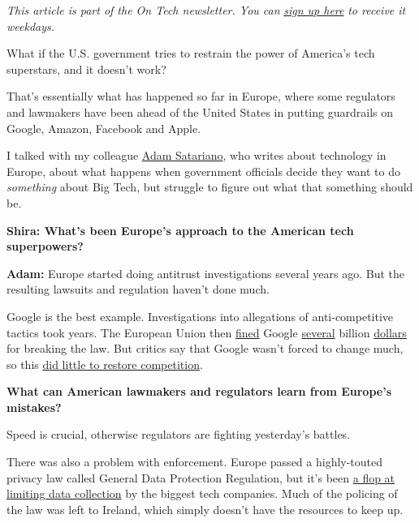 \emph{This article is part of the On Tech newsletter. You can}
\href{https://www.nytimes3xbfgragh.onion/newsletters/signup/OT}{\emph{sign
up here}} \emph{to receive it weekdays.}

What if the U.S. government tries to restrain the power of America's
tech superstars, and it doesn't work?

That's essentially what has happened so far in Europe, where some
regulators and lawmakers have been ahead of the United States in putting
guardrails on Google, Amazon, Facebook and Apple.

I talked with my colleague
\href{https://www.nytimes3xbfgragh.onion/by/adam-satariano}{Adam
Satariano}, who writes about technology in Europe, about what happens
when government officials decide they want to do \emph{something} about
Big Tech, but struggle to figure out what that something should be.

\textbf{Shira: What's been Europe's approach to the American tech
superpowers?}

\textbf{Adam:} Europe started doing antitrust investigations several
years ago. But the resulting lawsuits and regulation haven't done much.

Google is the best example. Investigations into allegations of
anti-competitive tactics took years. The European Union then
\href{https://www.nytimes3xbfgragh.onion/2018/07/18/technology/google-eu-android-fine.html}{fined}
Google
\href{https://www.nytimes3xbfgragh.onion/2017/06/27/technology/eu-google-fine.html}{several}
billion
\href{https://www.nytimes3xbfgragh.onion/2019/03/20/business/google-fine-advertising.html}{dollars}
for breaking the law. But critics say that Google wasn't forced to
change much, so this
\href{https://www.nytimes3xbfgragh.onion/2019/11/11/business/europe-technology-antitrust-regulation.html}{did
little to restore competition}.

\textbf{What can American lawmakers and regulators learn from Europe's
mistakes?}

Speed is crucial, otherwise regulators are fighting yesterday's battles.

There was also a problem with enforcement. Europe passed a highly-touted
privacy law called General Data Protection Regulation, but it's been
\href{https://www.nytimes3xbfgragh.onion/2020/04/27/technology/GDPR-privacy-law-europe.html}{a
flop at limiting data collection} by the biggest tech companies. Much of
the policing of the law was left to Ireland, which simply doesn't have
the resources to keep up.

